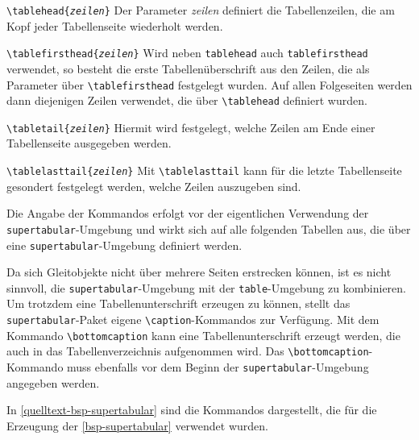 \begin{seList}
\item \texttt{\textbackslash{}tablehead\{{\textsl{zeilen}\}}} \newline
Der Parameter \textsl{zeilen} definiert die Tabellenzeilen, die am Kopf jeder Tabellenseite wiederholt werden.
\item \texttt{\textbackslash{}tablefirsthead\{{\textsl{zeilen}\}}} \newline
Wird neben \verb+tablehead+ auch \verb+tablefirsthead+ verwendet, so besteht die erste Tabellen\"uberschrift aus den 
Zeilen, die als Parameter \"uber \verb+\tablefirsthead+ festgelegt wurden. Auf allen Folgeseiten werden dann diejenigen 
Zeilen verwendet, die \"uber \verb+\tablehead+ definiert wurden.
\item \texttt{\textbackslash{}tabletail\{{\textsl{zeilen}\}}} \newline
Hiermit wird festgelegt, welche Zeilen am Ende einer Tabellenseite ausgegeben werden.
\item \texttt{\textbackslash{}tablelasttail\{{\textsl{zeilen}\}}} \newline
Mit \verb+\tablelasttail+ kann f\"ur die letzte Tabellenseite gesondert festgelegt werden, 
welche Zeilen auszugeben sind. 
\end{seList}

Die Angabe der Kommandos erfolgt vor der eigentlichen Verwendung der \texttt{su\-per\-ta\-bu\-lar}-Umgebung und wirkt sich auf alle 
folgenden Tabellen aus, die \"uber eine \texttt{su\-per\-ta\-bu\-lar}-Umgebung definiert werden. 

Da sich Gleitobjekte nicht \"uber mehrere Seiten erstrecken k\"onnen, ist es nicht sinnvoll, die \verb+supertabular+-Umgebung
mit der \verb+table+-Umgebung zu kombinieren. Um trotzdem eine Tabellenunterschrift erzeugen zu k\"onnen, stellt das 
\texttt{supertabular}-Paket eigene \verb+\caption+-Kommandos zur Verf\"ugung. Mit dem Kommando \texttt{\textbackslash{}bot\-tom\-cap\-tion} 
kann eine Tabellenunterschrift erzeugt werden, die auch in das Tabellenverzeichnis aufgenommen wird. Das \verb+\bottomcaption+-Kommando
muss ebenfalls vor dem Beginn der \verb+supertabular+-Umgebung angegeben werden.

In \vref{quelltext-bsp-supertabular} sind die Kommandos dargestellt, die f\"ur die Erzeugung der  \vref{bsp-supertabular} 
verwendet wurden. 

